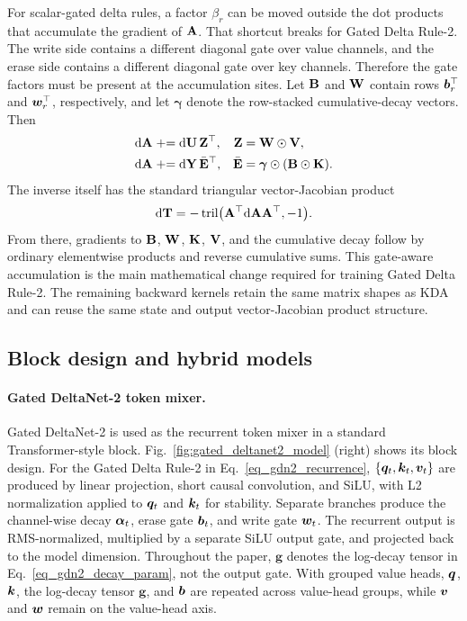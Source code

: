 \documentclass[10pt, logo, onecolumn, copyright]{nv}
\begin{document}
For scalar-gated delta rules, a factor $\beta_r$ can be moved outside the dot products that accumulate the gradient of ${\mathbf{A}}$. That shortcut breaks for Gated Delta Rule-2. The write side contains a different diagonal gate over value channels, and the erase side contains a different diagonal gate over key channels. Therefore the gate factors must be present at the accumulation sites. Let ${\mathbf{B}}$ and ${\mathbf{W}}$ contain rows ${\bm{b}}_r^\top$ and ${\bm{w}}_r^\top$, respectively, and let $\boldsymbol{\gamma}$ denote the row-stacked cumulative-decay vectors. Then
\begin{align}
    \mathrm{d}{\mathbf{A}} &\mathrel{+}= \mathrm{d}{\mathbf{U}}\,{\mathbf{Z}}^\top,
    &
    {\mathbf{Z}} &= {\mathbf{W}}\odot{\mathbf{V}},
\label{eq_gdn2_backward_u}\\
    \mathrm{d}{\mathbf{A}} &\mathrel{+}= \mathrm{d}{\mathbf{Y}}\,\bar{{\mathbf{E}}}^\top,
    &
    \bar{{\mathbf{E}}} &= \boldsymbol{\gamma}\odot({\mathbf{B}}\odot{\mathbf{K}}) .
\label{eq_gdn2_backward_y}
\end{align}
The inverse itself has the standard triangular vector-Jacobian product
\begin{align}
    \mathrm{d}{\mathbf{T}} =
    -\operatorname{tril}
    \bigl(
    {\mathbf{A}}^\top\mathrm{d}{\mathbf{A}}{\mathbf{A}}^\top,
    -1
    \bigr).
\label{eq_gdn2_inverse_vjp}
\end{align}
From there, gradients to ${\mathbf{B}}$, ${\mathbf{W}}$, ${\mathbf{K}}$, ${\mathbf{V}}$, and the cumulative decay follow by ordinary elementwise products and reverse cumulative sums. This gate-aware accumulation is the main mathematical change required for training Gated Delta Rule-2. The remaining backward kernels retain the same matrix shapes as KDA and can reuse the same state and output vector-Jacobian product structure.

\subsection{Block design and hybrid models}
\label{subsec_block_design}



\paragraph{Gated DeltaNet-2 token mixer.}
Gated DeltaNet-2 is used as the recurrent token mixer in a standard Transformer-style block. Fig.~\ref{fig:gated_deltanet2_model} (right) shows its block design. For the Gated Delta Rule-2 in Eq.~\ref{eq_gdn2_recurrence}, $\{{\bm{q}}_t,{\bm{k}}_t,{\bm{v}}_t\}$ are produced by linear projection, short causal convolution, and SiLU, with L2 normalization applied to ${\bm{q}}_t$ and ${\bm{k}}_t$ for stability. Separate branches produce the channel-wise decay ${\bm{\alpha}}_t$, erase gate ${\bm{b}}_t$, and write gate ${\bm{w}}_t$. The recurrent output is RMS-normalized, multiplied by a separate SiLU output gate, and projected back to the model dimension. Throughout the paper, $\boldsymbol{g}$ denotes the log-decay tensor in Eq.~\ref{eq_gdn2_decay_param}, not the output gate. With grouped value heads, ${\bm{q}}$, ${\bm{k}}$, the log-decay tensor $\boldsymbol{g}$, and ${\bm{b}}$ are repeated across value-head groups, while ${\bm{v}}$ and ${\bm{w}}$ remain on the value-head axis.
\end{document}
